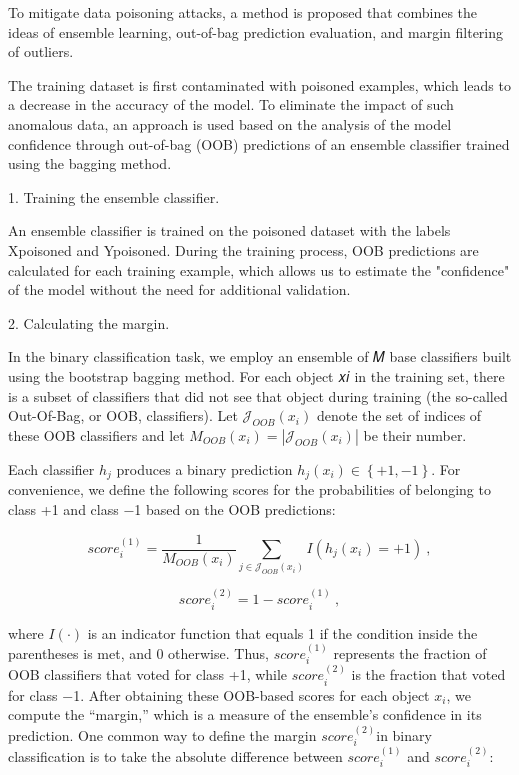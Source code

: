 \begin{multicols}{2}
To mitigate data poisoning attacks, a method is proposed that combines
the ideas of ensemble learning, out-of-bag prediction evaluation, and
margin filtering of outliers.

The training dataset is first contaminated with poisoned examples, which
leads to a decrease in the accuracy of the model. To eliminate the
impact of such anomalous data, an approach is used based on the analysis
of the model confidence through out-of-bag (OOB) predictions of an
ensemble classifier trained using the bagging method.

1. Training the ensemble classifier.

An ensemble classifier is trained on the poisoned dataset with the
labels Xpoisoned and Ypoisoned. During the training process, OOB
predictions are calculated for each training example, which allows us to
estimate the "confidence" of the model without the need for additional
validation.

2. Calculating the margin.

In the binary classification task, we employ an ensemble of 𝑀 base
classifiers built using the bootstrap bagging method. For each object 𝑥𝑖
in the training set, there is a subset of classifiers that did not see
that object during training (the so-called Out-Of-Bag, or OOB,
classifiers). Let \(\mathcal{J}_{OOB}(x_{i})\) denote the set of indices
of these OOB classifiers and let
\(M_{OOB}\left( x_{i} \right) = \left| \mathcal{J}_{OOB}(x_{i}) \right|\)
be their number.

Each classifier \(h_{j}\) produces a binary prediction
\(h_{j}(x_{i}) \in \left\{ + 1, - 1 \right\}\). For convenience, we
define the following scores for the probabilities of belonging to class
+1 and class −1 based on the OOB predictions:

\[score_{i}^{(1)} = \frac{1}{M_{OOB}(x_{i})}\sum_{j \in \mathcal{J}_{OOB}(x_{i})}^{}{I\left( h_{j}\left( x_{i} \right) = + 1 \right)\ ,}\]

\[score_{i}^{(2)} = 1 - score_{i}^{(1)}\ ,\]

where \(I( \cdot )\) is an indicator function that equals 1
if the condition inside the parentheses is met, and 0 otherwise. Thus,
\(score_{i}^{(1)}\) represents the fraction of OOB classifiers that
voted for class +1, while \(score_{i}^{(2)}\) is the fraction that voted
for class −1. After obtaining these OOB-based scores for each object
\(x_{i}\), we compute the ``margin,'' which is a measure of the
ensemble's confidence in its prediction. One common way to define the
margin \(score_{i}^{(2)}\)in binary classification is to take the
absolute difference between \(score_{i}^{(1)}\) and \(score_{i}^{(2)}\):


\end{multicols}
